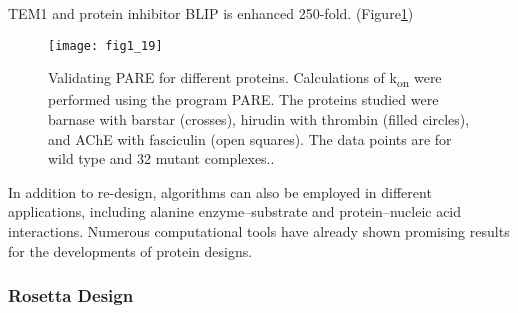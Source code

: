 \begin{refsection}
TEM1 and protein inhibitor BLIP is enhanced 250-fold\cite{Selzer2000}.
(Figure\ref{fig:tem1})
\begin{figure}[h!] \centering \texttt{[image: fig1\_19]}
    \caption[Validating PARE for different proteins. Calculations of
        k\textsubscript{on} were performed using the program PARE. The proteins
        studied were barnase with barstar (crosses), hirudin with thrombin
        (filled circles), and AChE with fasciculin (open squares). The data
        points are for wild type and 32 mutant complexes.]{Validating PARE for
            different proteins.  Calculations of k\textsubscript{on} were
            performed using the program PARE. The proteins studied were barnase
            with barstar (crosses), hirudin with thrombin (filled circles), and
            AChE with fasciculin (open squares). The data points are for wild
            type and 32 mutant complexes.\cite{Selzer2000}.} 
            \label{fig:tem1} 
\end{figure}
In addition to re-design, algorithms can also be employed in different
applications, including alanine enzyme–substrate\cite{Bolon2001,Jiang2008} and
protein–nucleic acid interactions\cite{Ashworth2006}. Numerous computational
tools have already shown promising results for the developments of protein
designs.

\subsubsection{Rosetta Design}


\end{refsection}
